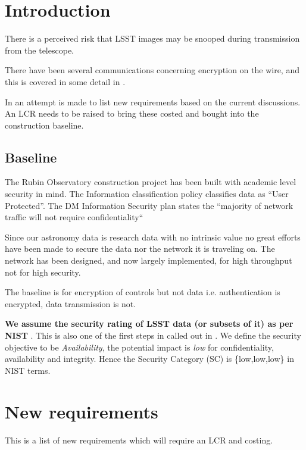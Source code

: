 \section{Introduction} \label{sec:intro}

There is a perceived  risk that LSST  images may be snooped during transmission from the telescope. 

There have been several communications concerning encryption on the wire, and this is covered in some detail in .

In  an attempt is made to list new requirements based on the current discussions.
An LCR needs to be raised to bring these costed and bought into the construction baseline.


\subsection{Baseline }
The Rubin Observatory construction project has been built with academic level security in mind.
The
 Information classification policy  classifies data as  “User Protected”.
The DM Information Security plan  states the “majority of network traffic will not require confidentiality“

Since our astronomy data is research data with no intrinsic value no great efforts have been made to secure the
data nor the network it is traveling on.
The network has been designed, and now largely implemented, for high throughput not for high security.

The baseline is for encryption of controls but not data i.e. authentication is encrypted, data transmission is not.

{\bf We assume the security rating of LSST data (or subsets of it) as per NIST }. This is also one of the first steps in  called out in .
We define the security objective to be \emph{Availability}, the potential impact is \emph{low} for confidentiality, availability and integrity. Hence the Security Category (SC) is \{low,low,low\} in NIST terms.


\section{New requirements} \label{sec:nr}
This is a list of new requirements which will require an LCR and costing.



